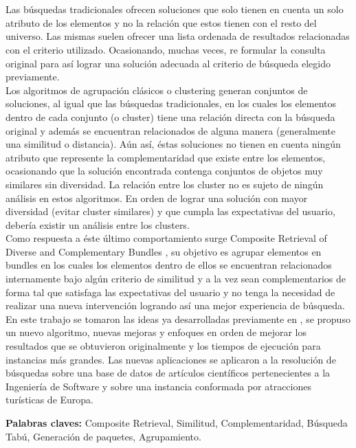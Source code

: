 \chapter*{\runtitulo}

\noindent Las búsquedas tradicionales ofrecen soluciones que solo tienen en cuenta un solo atributo de los elementos y no la relación que estos tienen con el resto del universo. Las mismas suelen ofrecer una lista ordenada de resultados relacionadas con
el criterio utilizado. Ocasionando, muchas veces, re formular la consulta original para así lograr una solución adecuada al criterio de búsqueda elegido previamente.\\
Los algoritmos de agrupación clásicos o clustering generan conjuntos de soluciones, al igual que las búsquedas tradicionales, en los cuales los elementos dentro de cada conjunto (o cluster) tiene una relación directa con la búsqueda original y además se encuentran relacionados de alguna manera (generalmente una similitud o distancia). Aún así, éstas soluciones no tienen en cuenta ningún atributo que represente la complementaridad que existe entre los elementos, ocasionando que la solución encontrada contenga conjuntos de objetos muy similares sin diversidad. La relación entre los cluster no es sujeto de ningún análisis en estos algoritmos. En orden de lograr una solución con mayor diversidad (evitar cluster similares) y que cumpla las expectativas del usuario, debería existir un análisis entre los clusters.\\
Como respuesta a éste último comportamiento surge Composite Retrieval of Diverse and Complementary Bundles \cite{compositeRetrival}, su objetivo es agrupar elementos en bundles en los cuales los elementos dentro de ellos se encuentran relacionados internamente bajo algún criterio de similitud y a la vez sean complementarios de forma tal que satisfaga las expectativas del usuario y no tenga la necesidad de realizar una nueva intervención logrando así una mejor experiencia de búsqueda.\\
En este trabajo se tomaron las ideas ya desarrolladas previamente en \cite{compositeRetrival}, se propuso un nuevo algoritmo, nuevas mejoras y enfoques en orden de mejorar los resultados que se obtuvieron originalmente y los tiempos de ejecución para instancias más grandes. Las nuevas aplicaciones se aplicaron a la resolución de búsquedas sobre una base de datos de artículos científicos pertenecientes a la Ingeniería de Software \cite{dataDrive} y sobre una instancia conformada por atracciones turísticas de Europa.

\bigskip

\noindent\textbf{Palabras claves:} Composite Retrieval, Similitud, Complementaridad, Búsqueda Tabú, Generación de paquetes, Agrupamiento.